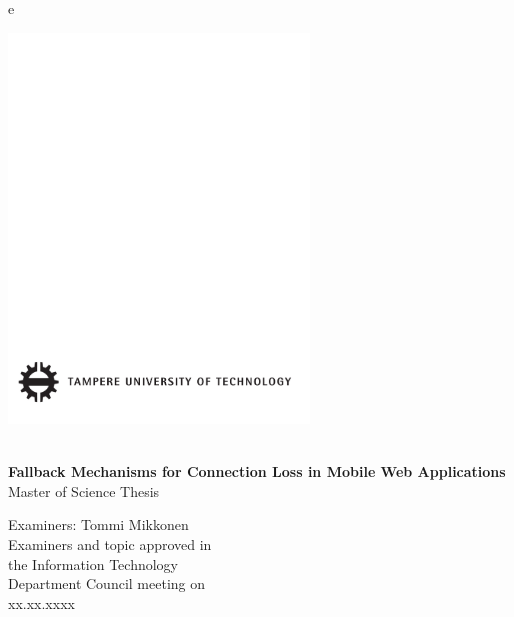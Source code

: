 e 
\thispagestyle{empty}
 
\vspace*{-.5cm}\noindent
 
 
\includegraphics[width=8cm]{assets/tut-logo}
 
\vspace{6.8cm}
 
\\
{\bf\large \textsf{Fallback Mechanisms for Connection Loss in Mobile Web Applications}}\\
\textsf{Master of Science Thesis}
 
\vspace{8.7cm} %
 
\begin{flushright}
  
\begin{minipage}[c]{6.8cm}
\begin{spacing}{1.0}
\textsf{Examiners: Tommi Mikkonen}\\
\textsf{Examiners and topic approved in}\\ 
\textsf{the Information Technology}\\
\textsf{Department Council meeting on}\\
\textsf{xx.xx.xxxx}\\
\end{spacing}
\end{minipage}
\end{flushright}
 
